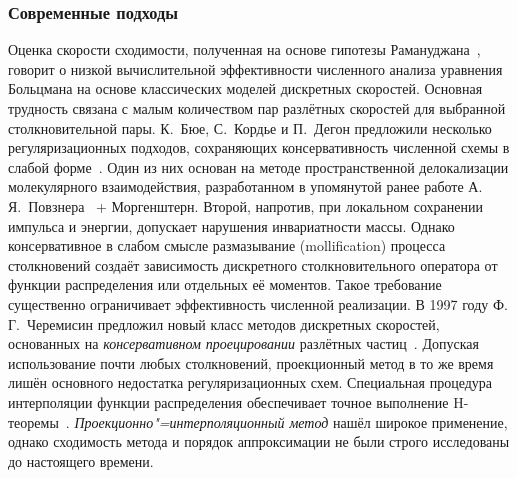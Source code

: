 \subsubsection{Современные подходы}



Оценка скорости сходимости, полученная на основе гипотезы Рамануджана~\cite{Ramanujan1916},
говорит о низкой вычислительной эффективности численного анализа уравнения Больцмана
на основе классических моделей дискретных скоростей. Основная трудность связана с малым количеством
пар разлётных скоростей для выбранной столкновительной пары.
К.~Бюе, С.~Кордье и П.~Дегон предложили несколько регуляризационных подходов,
сохраняющих консервативность численной схемы в слабой форме~\cite{Buet1998}.
Один из них основан на методе пространственной делокализации молекулярного взаимодействия,
разработанном в упомянутой ранее работе А.\,Я.~Повзнера~\cite{Povzner1962} + Моргенштерн.
Второй, напротив, при локальном сохранении импульса и энергии, допускает нарушения инвариатности массы.
Однако консервативное в слабом смысле размазывание (mollification) процесса столкновений
создаёт зависимость дискретного столкновительного оператора от функции распределения
или отдельных её моментов. Такое требование существенно ограничивает эффективность численной реализации.
В 1997 году Ф.\,Г.~Черемисин предложил новый класс методов дискретных скоростей,
основанных на \emph{консервативном проецировании} разлётных частиц~\cite{Tcheremissine1997, Tcheremissine1998}.
Допуская использование почти любых столкновений,
проекционный метод в то же время лишён основного недостатка регуляризационных схем.
Специальная процедура интерполяции функции распределения обеспечивает точное выполнение H-теоремы~\cite{Tcheremissine2000}.
\emph{Проекционно"=интерполяционный метод} нашёл широкое применение,
однако сходимость метода и порядок аппроксимации не были строго исследованы до настоящего времени.


